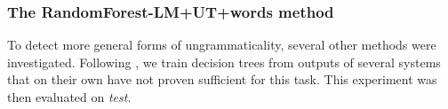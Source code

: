 \documentclass[a4paper,10pt]{scrartcl}
\theoremstyle{style}
\begin{document}




\subsubsection{The RandomForest-LM+UT+words method}
To detect more general forms of ungrammaticality, several other methods were investigated. Following \cite{wagner2007comparative}, we train decision trees from outputs of several systems that on their own have not proven sufficient for this task. %
This experiment was then evaluated on \textit{test}.
\end{document}
